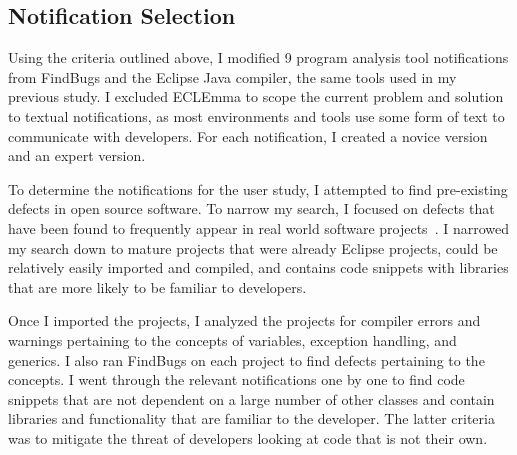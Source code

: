 



\subsection{Notification Selection}

Using the criteria outlined above, I modified 9 program analysis tool notifications from FindBugs and the Eclipse Java compiler, the same tools used in my previous study. I excluded ECLEmma to scope the current problem and solution to textual notifications, as most environments and tools use some form of text to communicate with developers. For each notification, I created a novice version and an expert version.

To determine the notifications for the user study, I attempted to find pre-existing defects in open source software. To narrow my search, I focused on defects that have been found to frequently appear in real world software projects~\cite{ayewah2010google}. 
I narrowed my search down to mature projects that were already Eclipse projects, could be relatively easily imported and compiled, and contains code snippets with libraries that are more likely to be familiar to developers.

Once I imported the projects, I analyzed the projects for compiler errors and warnings pertaining to the concepts of variables, exception handling, and generics.
I also ran FindBugs on each project to find defects pertaining to the concepts.
I went through the relevant notifications one by one to find code snippets that are not dependent on a large number of other classes and contain libraries and functionality that are familiar to the developer. The latter criteria was to mitigate the threat of developers looking at code that is not their own.

